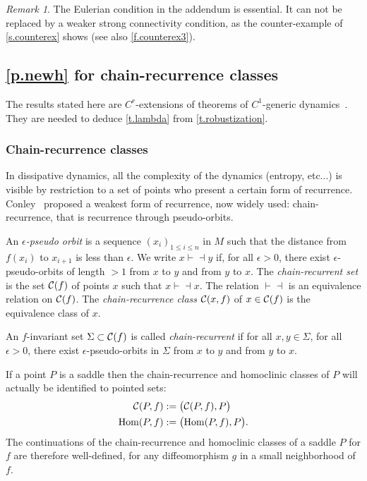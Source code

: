 \documentclass[11pt, a4paper]{amsart}
\theoremstyle{plain}
\theoremstyle{definition}
\theoremstyle{remark}
\newtheorem{remark}[proposition]{Remark}
\numberwithin{equation}{section}         %
\def\vdashv{\vdash\!\dashv}
\def\Hom{\operatorname{Hom}}
\begin{document}
\begin{remark}
The Eulerian condition in the addendum is essential. It can not be replaced by a weaker strong connectivity condition, as the counter-example of \cref{s.counterex} shows (see also \cref{f.counterex3}).
\end{remark}

\subsection{\cref{p.newh}  for chain-recurrence classes}

The results stated here are $C^r$-extensions of theorems of $C^1$-generic dynamics~\cite{BDP,W,G2,BB}. They are needed to deduce \cref{t.lambda} from \cref{t.robustization}. 

\subsubsection{Chain-recurrence classes}
In dissipative dynamics, all the complexity of the dynamics (entropy, etc...) is visible by restriction to a set of points who present a certain form of recurrence. Conley~\cite{Co} proposed a weakest form of recurrence, now widely used: chain-recurrence, that is recurrence through pseudo-orbits. 

An {\em $\epsilon$-pseudo orbit} is a sequence $(x_i)_{1\leq i\leq n}$ in $M$ such that the distance from $f(x_i)$ to $x_{i+1}$ is less than $\epsilon$. 
We write $x${\SMALL$\vdashv$}$y$ if, for all $\epsilon>0$, there exist $\epsilon$-pseudo-orbits of length $>1$ from $x$ to $y$ and from $y$ to $x$. The {\em chain-recurrent set} is the set ${\mathcal C}(f)$ of points $x$ such that $x${\SMALL$\vdashv$}$x$. The relation {\SMALL$\vdashv$} is an equivalence relation on ${\mathcal C}(f)$. The {\em chain-recurrence class ${\mathcal C}(x,f)$} of $x\in {\mathcal C}(f)$ is the equivalence class of $x$.

 An $f$-invariant set $\Sigma\subset {\mathcal C}(f)$ is called {\em chain-recurrent} if for all $x,y\in \Sigma$, for all $\epsilon>0$, there exist $\epsilon$-pseudo-orbits in $\Sigma$ from $x$ to $y$ and from $y$ to $x$. 
\medskip

If a point $P$ is a saddle then the chain-recurrence and homoclinic classes of $P$ will actually be identified to pointed sets:
\begin{align*}\cC(P,f)&:=\bigl(\cC(P,f),P\bigr)\\
\Hom(P,f)&:=\bigl(\Hom(P,f),P\bigr).
\end{align*}
The continuations of the chain-recurrence and homoclinic classes of a saddle $P$ for $f$ are therefore well-defined, for any diffeomorphism $g$ in a small neighborhood of $f$.
\end{document}
